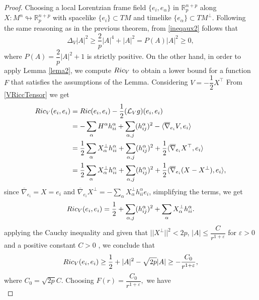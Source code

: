 \documentclass[10pt,a4paper]{amsart}
\begin{document}
\begin{proof}
Choosing a local Lorentzian frame field $\{e_i,e_\alpha\}$ in $\mathbb R_p^{n+p}$ along $X:M^n\looparrowright\mathbb R^{n+p}_{p}$ with spacelike $\{e_i\}\subset TM$ and timelike $\{e_\alpha\}\subset TM^\perp$.	Following the same reasoning as in the previous theorem, from \eqref{ineqaux2} follows that 
\begin{equation}\label{1estimativa}
\Delta_V |A|^{2}\geq\frac{2}{p}|A|^{4}+|A|^{2} = P(A)  |A|^2 \geq 0,
\end{equation}	
where $P(A) = \dfrac{2}{p}|A|^2 + 1$ is strictly positive. On the other hand, in order to apply Lemma \ref{lema2}, we compute ${\rm Ric}_V$ to obtain a lower bound for a function $F$ that satisfies the assumptions of the Lemma. Considering $V=-\dfrac{1}{2}X^\top$ From \eqref{VRiccTensor} we get
$$
\begin{aligned}
{\rm Ric}_V(e_i, e_i) 
& = {\rm Ric}(e_i, e_i) - \dfrac{1}{2}(\mathcal{L}_V g)(e_i, e_i) \\
& = - \sum_{\alpha} H^\alpha h^\alpha_{ii} + \sum_{\alpha, j} (h^\alpha_{ij})^2 - \langle \overline{\nabla}_{e_i} V, e_i \rangle \\
& = \dfrac{1}{2}\sum_{\alpha} X_\alpha^\perp h^\alpha_{ii} + \sum_{\alpha, j} (h^\alpha_{ij})^2 + \dfrac{1}{2} \langle \overline{\nabla}_{e_i} X^\top, e_i \rangle \\
& = \dfrac{1}{2}\sum_{\alpha} X_\alpha^\perp h^\alpha_{ii} + \sum_{\alpha, j} (h^\alpha_{ij})^2 + \dfrac{1}{2} \langle \overline{\nabla}_{e_i} (X - X^\perp), e_i \rangle, \\
\end{aligned}
$$
since $\overline{\nabla}_{e_i} = X = e_i$ and $\overline{\nabla}_{e_i} X^\perp = - \displaystyle\sum_{\alpha} X^\perp_\alpha h^{\alpha}_{ii} e_i$, simplifying the terms, we get
\begin{equation}
{\rm Ric}_V(e_i, e_i) = \dfrac{1}{2} +  \sum_{\alpha, j} (h^\alpha_{ij})^2 + \sum_\alpha X^\perp_\alpha h^{\alpha}_{ii}.
\end{equation}
applying the Cauchy inequality and given that $||X^\perp ||^2<2p$, $|A|\leq \dfrac{C}{r^{1+ \varepsilon}}$ for $\varepsilon > 0$ and a positive constant $C>0$ , we conclude that
\begin{equation}
{\rm Ric}_V(e_i, e_i) \geq \dfrac{1}{2} + |A|^2 - \sqrt{2p}|A| \geq - \dfrac{C_0}{r^{1+ \varepsilon}},
\end{equation}
where $C_0 = \sqrt{2p}C$. Choosing $F(r) = \dfrac{C_0}{r^{1+\varepsilon}},$ we have
\begin{equation}

\end{equation}
\end{proof}
\end{document}
